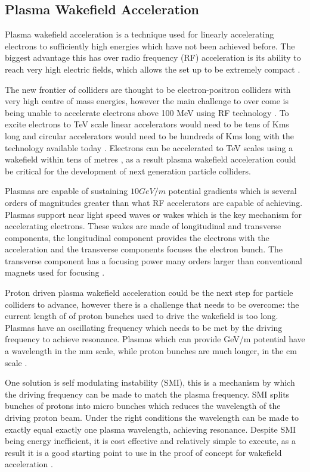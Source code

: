\documentclass[journal, a4paper,11pt]{IEEEtran}
\begin{document}
\subsection*{\textbf{Plasma Wakefield Acceleration}}

Plasma wakefield acceleration is a technique used for linearly accelerating electrons to sufficiently high energies which have not been achieved before. The biggest advantage this has over radio frequency (RF) acceleration is its ability to reach very high electric fields, which allows the set up to be extremely compact \cite{0409}. 

The new frontier of colliders are thought to be electron-positron colliders with very high centre of mass energies, however the main challenge to over come is being unable to accelerate electrons above 100 MeV using RF technology \cite{0114}. To excite electrons to TeV scale linear accelerators would need to be tens of Kms long and circular accelerators would need to be hundreds of Kms long with the technology available today \cite{0114}. Electrons can be accelerated to TeV scales using a wakefield within tens of metres \cite{0409}, as a result plasma wakefield acceleration could be critical for the development of next generation particle colliders.

Plasmas are capable of sustaining $10 GeV/m$ potential gradients which is several orders of magnitudes greater than what RF accelerators are capable of achieving. Plasmas support near light speed waves or wakes which is the key mechanism for accelerating electrons. These wakes are made of longitudinal and transverse components, the longitudinal component provides the electrons with the acceleration and the transverse components focuses the electron bunch. The transverse component has a focusing power many orders larger than conventional magnets used for focusing \cite{0114}.

Proton driven plasma wakefield acceleration could be the next step for particle colliders to advance, however there is a challenge that needs to be overcome: the current length of of proton bunches used to drive the wakefield is too long. Plasmas have an oscillating frequency which needs to be met by the driving frequency to achieve resonance. Plasmas which can provide GeV/m potential have a wavelength in the mm scale, while proton bunches are much longer, in the cm scale \cite{0114}.

One solution is self modulating instability (SMI), this is a mechanism by which the driving frequency can be made to match the plasma frequency. SMI splits bunches of protons into micro bunches which reduces the wavelength of the driving proton beam. Under the right conditions the wavelength can be made to exactly equal exactly one plasma wavelength, achieving resonance. Despite SMI being energy inefficient, it is cost effective and relatively simple to execute, as a result it is a good starting point to use in the proof of concept for wakefield acceleration \cite{1115}.
\end{document}
